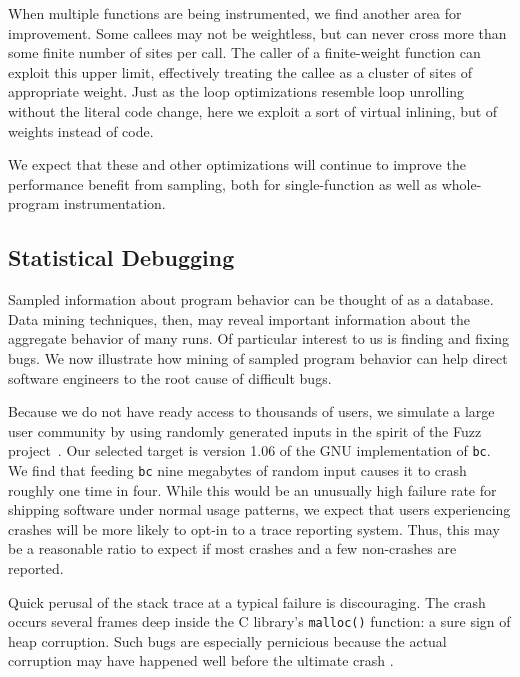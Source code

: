 When multiple functions are being instrumented, we find another area
for improvement.  Some callees may not be weightless, but can never
cross more than some finite number of sites per call.  The caller of a
finite-weight function can exploit this upper limit, effectively
treating the callee as a cluster of sites of appropriate weight.  Just
as the loop optimizations resemble loop unrolling without the literal
code change, here we exploit a sort of virtual inlining, but of
weights instead of code.

We expect that these and other optimizations will continue to improve
the performance benefit from sampling, both for single-function as
well as whole-program instrumentation.

\subsection{Statistical Debugging}
\label{sec:debug}

Sampled information about program behavior can be thought of as a
database.  Data mining techniques, then, may reveal important
information about the aggregate behavior of many runs.  Of particular
interest to us is finding and fixing bugs.  We now illustrate how
mining of sampled program behavior can help direct software engineers
to the root cause of difficult bugs.

Because we do not have ready access to thousands of users, we simulate
a large user community by using randomly generated inputs in the
spirit of the Fuzz project~\cite{MKLMMNS95}.  Our selected target is
version 1.06 of the GNU implementation of \texttt{bc}.  We find that
feeding \texttt{bc} nine megabytes of random input causes it to crash
roughly one time in four.  While this would be an unusually high
failure rate for shipping software under normal usage patterns, we
expect that users experiencing crashes will be more likely to opt-in
to a trace reporting system.  Thus, this may be a reasonable ratio to
expect if most crashes and a few non-crashes are reported.

Quick perusal of the stack trace at a typical failure is discouraging.
The crash occurs several frames deep inside the C library's
\texttt{malloc()} function: a sure sign of heap corruption.  Such bugs
are especially pernicious because the actual corruption may have
happened well before the ultimate crash \cite{Eisenstadt1993b}.

